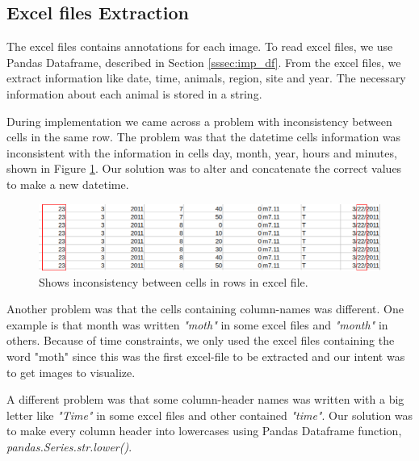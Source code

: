 \documentclass[USenglish]{uit-thesis}
\begin{document}


\subsection{Excel files Extraction}
The excel files contains annotations for each image. To read excel files, we use Pandas Dataframe, described in Section \ref{sssec:imp_df}. From the excel files, we extract information like date, time, animals, region, site and year. The necessary information about each animal is stored in a string.

During implementation we came across a problem with inconsistency between cells in the same row. The problem was that the datetime cells information was inconsistent with the information in cells day, month, year, hours and minutes, shown in Figure \ref{fig:inconsistency}. Our solution was to alter and concatenate the correct values to make a new datetime.

\begin{figure}[b]
\centering
\includegraphics[width=\textwidth]{inconsistency2.png}
\caption{Shows inconsistency between cells in rows in excel file.}
\label{fig:inconsistency}
\end{figure}


Another problem was that the cells containing column-names was different. One example is that month was written \textit{"moth"} in some excel files and \textit{"month"} in others. Because of time constraints, we only used the excel files containing the word "moth" since this was the first excel-file to be extracted and our intent was to get images to visualize. 

A different problem was that some column-header names was written with a big letter like \textit{"Time"} in some excel files and other contained \textit{"time"}. Our solution was to make every column header into lowercases using Pandas Dataframe function, \textit{pandas.Series.str.lower()}.
\end{document}
